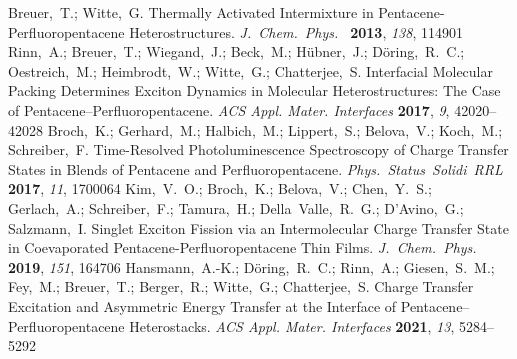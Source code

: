 \documentclass[journal=jpclcd,manuscript=letter]{achemso}
\begin{document}
\begin{mcitethebibliography}{51}
Breuer,~T.; Witte,~G. Thermally Activated Intermixture in
  Pentacene-Perfluoropentacene Heterostructures. \emph{J.~Chem.~Phys.~}
  \textbf{2013}, \emph{138}, 114901\relax
\mciteBstWouldAddEndPuncttrue
\mciteSetBstMidEndSepPunct{\mcitedefaultmidpunct}
{\mcitedefaultendpunct}{\mcitedefaultseppunct}\relax
\EndOfBibitem
{}
Rinn,~A.; Breuer,~T.; Wiegand,~J.; Beck,~M.; Hübner,~J.; Döring,~R.~C.;
  Oestreich,~M.; Heimbrodt,~W.; Witte,~G.; Chatterjee,~S. Interfacial Molecular
  Packing Determines Exciton Dynamics in Molecular Heterostructures: The Case
  of Pentacene–Perfluoropentacene. \emph{ACS Appl. Mater. Interfaces}
  \textbf{2017}, \emph{9}, 42020--42028\relax
\mciteBstWouldAddEndPuncttrue
\mciteSetBstMidEndSepPunct{\mcitedefaultmidpunct}
{\mcitedefaultendpunct}{\mcitedefaultseppunct}\relax
\EndOfBibitem
{}
Broch,~K.; Gerhard,~M.; Halbich,~M.; Lippert,~S.; Belova,~V.; Koch,~M.;
  Schreiber,~F. Time-Resolved Photoluminescence Spectroscopy of Charge Transfer
  States in Blends of Pentacene and Perfluoropentacene.
  \emph{Phys.~Status~Solidi~RRL} \textbf{2017}, \emph{11}, 1700064\relax
\mciteBstWouldAddEndPuncttrue
\mciteSetBstMidEndSepPunct{\mcitedefaultmidpunct}
{\mcitedefaultendpunct}{\mcitedefaultseppunct}\relax
\EndOfBibitem
{}
Kim,~V.~O.; Broch,~K.; Belova,~V.; Chen,~Y.~S.; Gerlach,~A.; Schreiber,~F.;
  Tamura,~H.; Della~Valle,~R.~G.; D’Avino,~G.; Salzmann,~I. 
  Singlet Exciton Fission via an Intermolecular Charge Transfer State in
  Coevaporated Pentacene-Perfluoropentacene Thin Films. \emph{J.~Chem.~Phys.~}
  \textbf{2019}, \emph{151}, 164706\relax
\mciteBstWouldAddEndPuncttrue
\mciteSetBstMidEndSepPunct{\mcitedefaultmidpunct}
{\mcitedefaultendpunct}{\mcitedefaultseppunct}\relax
\EndOfBibitem
{}
Hansmann,~A.-K.; D\"oring,~R.~C.; Rinn,~A.; Giesen,~S.~M.; Fey,~M.; Breuer,~T.;
  Berger,~R.; Witte,~G.; Chatterjee,~S. Charge Transfer Excitation and
  Asymmetric Energy Transfer at the Interface of Pentacene–Perfluoropentacene
  Heterostacks. \emph{ACS Appl. Mater. Interfaces} \textbf{2021}, \emph{13},
  5284--5292\relax

\end{mcitethebibliography}
\end{document}
